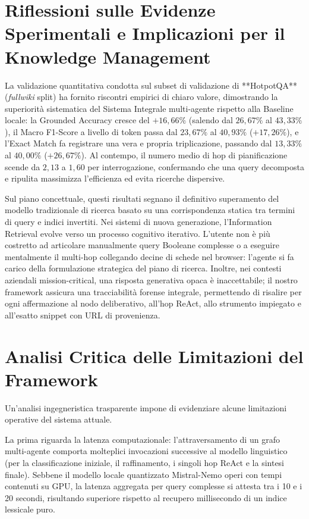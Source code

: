 \section{Riflessioni sulle Evidenze Sperimentali e Implicazioni per il Knowledge Management}
\label{sec:riflessioni_implicazioni}

La validazione quantitativa condotta sul subset di validazione di **HotpotQA** (\textit{fullwiki} split) ha fornito riscontri empirici di chiaro valore, dimostrando la superiorità sistematica del Sistema Integrale multi-agente rispetto alla Baseline locale: la Grounded Accuracy cresce del $+16,66\%$ (salendo dal $26,67\%$ al $43,33\%$), il Macro F1-Score a livello di token passa dal $23,67\%$ al $40,93\%$ ($+17,26\%$), e l'Exact Match fa registrare una vera e propria triplicazione, passando dal $13,33\%$ al $40,00\%$ ($+26,67\%$). Al contempo, il numero medio di hop di pianificazione scende da $2,13$ a $1,60$ per interrogazione, confermando che una query decomposta e ripulita massimizza l'efficienza ed evita ricerche dispersive.

Sul piano concettuale, questi risultati segnano il definitivo superamento del modello tradizionale di ricerca basato su una corrispondenza statica tra termini di query e indici invertiti. Nei sistemi di nuova generazione, l'Information Retrieval evolve verso un processo cognitivo iterativo. L'utente non è più costretto ad articolare manualmente query Booleane complesse o a eseguire mentalmente il multi-hop collegando decine di schede nel browser: l'agente si fa carico della formulazione strategica del piano di ricerca. Inoltre, nei contesti aziendali mission-critical, una risposta generativa opaca è inaccettabile; il nostro framework assicura una tracciabilità forense integrale, permettendo di risalire per ogni affermazione al nodo deliberativo, all'hop ReAct, allo strumento impiegato e all'esatto snippet con URL di provenienza.

\section{Analisi Critica delle Limitazioni del Framework}
\label{sec:limitazioni}

Un'analisi ingegneristica trasparente impone di evidenziare alcune limitazioni operative del sistema attuale. 

La prima riguarda la latenza computazionale: l'attraversamento di un grafo multi-agente comporta molteplici invocazioni successive al modello linguistico (per la classificazione iniziale, il raffinamento, i singoli hop ReAct e la sintesi finale). Sebbene il modello locale quantizzato Mistral-Nemo operi con tempi contenuti su GPU, la latenza aggregata per query complesse si attesta tra i 10 e i 20 secondi, risultando superiore rispetto al recupero millisecondo di un indice lessicale puro.

